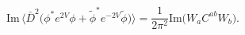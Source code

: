 \begin{equation}\label{Im_Of_Anomaly}
\mbox{Im}\,\Big\langle \bar D^2 \Big(\phi^* e^{2V}\phi
+ \tilde\phi^* e^{-2V}\tilde\phi\Big)\Big\rangle
= \frac{1}{2\pi^2} \mbox{Im}\Big(W_a C^{ab} W_b\Big).
\end{equation}

